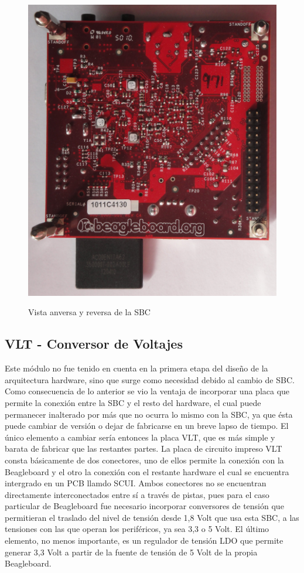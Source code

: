 \begin{figure}[H]
{  \includegraphics[scale=.08]{Imagenes/SBC_b.jpg} }

  \caption{Vista anversa y reversa de la SBC}\label{sbcFB}
\end{figure}


\subsection{VLT - Conversor de Voltajes}
Este módulo no fue tenido en cuenta en la primera etapa del diseño de la arquitectura hardware, sino que surge como necesidad debido al cambio de SBC. Como consecuencia de lo anterior se vio la ventaja de incorporar una placa que permite la conexión entre la SBC y el resto del hardware, el cual puede permanecer inalterado por más que no ocurra lo mismo con la SBC, ya que ésta puede cambiar de versión o dejar de fabricarse en un breve lapso de tiempo. El único elemento a cambiar sería entonces la placa VLT, que es más simple y barata de fabricar que las restantes partes.
La placa de circuito impreso VLT consta básicamente de dos conectores, uno de ellos permite la conexión con la Beagleboard y el otro la conexión con el restante hardware el cual se encuentra intergrado en un PCB llamdo SCUI. Ambos conectores no se encuentran directamente interconectados entre sí a través de pistas, pues para el caso particular de Beagleboard fue necesario incorporar conversores de tensión que permitieran el traslado del nivel de tensión desde 1,8 Volt que usa esta SBC, a las tensiones con las que operan los periféricos, ya sea 3,3 o 5 Volt.
El último elemento, no menos importante, es un regulador de tensión LDO que permite generar 3,3 Volt a partir de la fuente de tensión de 5 Volt de la propia Beagleboard.

